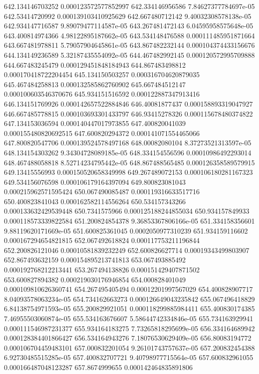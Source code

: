 {642.134146703252 0.000123572577852997
642.334146956586 7.84627377784697e-05
642.53414720992 0.000139103410925629
642.667480712142 9.40032308578138e-05
642.934147716587 9.89079477114587e-05
643.267481472143 6.04595958575648e-05
643.400814974366 4.98122895187662e-05
643.534148476588 0.000111485951871664
643.667481978811 5.79057904645861e-05
643.867482232144 0.000104374433156676
644.134149236589 5.32187435554092e-05
644.467482992145 0.000120572995709888
644.667483245479 0.000129451848184943
644.867483498812 0.000170418722204454
645.134150503257 0.000316704620879035
645.467484258813 0.000132585862760902
645.667484512147 0.000100603546370676
645.934151516592 0.000122887347913416
646.134151769926 0.000142657522884846
646.40081877437 0.000158893319047927
646.667485778815 0.000103693301433797
646.93415278326 0.000115678480374822
647.134153036594 0.000140447017973855
647.400820041039 0.000155480820692515
647.600820294372 0.000141071554465066
647.800820547706 0.000139524578497168
648.00082080104 8.37273521313597e-05
648.134154303262 9.34304728089185e-05
648.334154556596 0.00010986492293014
648.467488058818 8.52714234795442e-05
648.867488565485 0.000126358589579915
649.13415556993 0.000150520658349998
649.267489072153 0.000106180281167323
649.534156076598 0.000106179164397094
649.800823081043 0.000215962571595424
650.067490085487 0.000119316633517716
650.400823841043 0.000162582114556264
650.534157343266 0.000133632429539448
650.7341575966 0.000125188244855034
650.934157849933 0.000118573339822584
651.200824854378 9.36853367806166e-05
651.334158356601 9.88119620171669e-05
651.600825361045 0.0002050977310239
651.934159116602 0.000167294654821815
652.067492618824 0.000117753211196844
652.200826121046 0.00010581839232249
652.600826627714 0.00019343499803907
652.867493632159 0.000154895213741813
653.067493885492 0.000192768212213441
653.267494138826 0.000151429407871502
653.600827894382 0.000219030176946854
654.000828401049 0.000109810626360741
654.267495405494 0.00012201997567029
654.400828907717 8.04093578063234e-05
654.734162663273 0.000126649043235842
655.067496418829 6.84138754971593e-05
655.200829921051 0.000118299885984411
655.400830174385 7.46955503060874e-05
655.534163676607 5.58644742334846e-05
655.734163929941 0.000111546987231377
655.934164183275 7.73265818295699e-05
656.334164689942 0.000128384401866427
656.534164943276 7.18076530629409e-05
656.80083194772 0.000106704459483101
657.000832201054 9.26101743757637e-05
657.200832454388 6.92730485515285e-05
657.400832707721 9.40798977715564e-05
657.600832961055 0.000166487048123287
657.8674999655 0.000142464835891806
}
